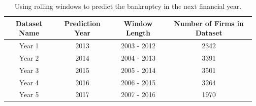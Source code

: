 \begin{table}[h!]
\begin{center}
 \begin{tabular}{|c|c|c|c|}
\hline
 Dataset Name & Prediction Year & Window Length & Number of Firms in Dataset 

  \\ [0.5ex] 
\hline\hline
 
Year 1 & 2013 & 2003 - 2012 & 2342  \\ \hline
Year 2 & 2014 & 2004 - 2013 & 3391  \\ \hline
Year 3 & 2015 & 2005 - 2014 & 3501  \\ \hline
Year 4 & 2016 & 2006 - 2015 & 3264  \\ \hline
Year 5 & 2017 & 2007 - 2016 & 1970  \\ 
\hline
\end{tabular}
\end{center}

    \caption{Using rolling windows to predict the bankruptcy in the next financial year.}
\label{table:rolling Window}
\end{table}


  
    



